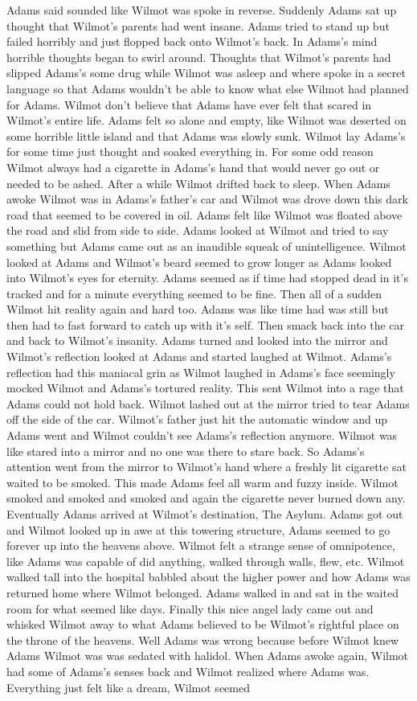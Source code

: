 \documentclass[12pt]{book}
\begin{document}
Adams said sounded like Wilmot was spoke in reverse. Suddenly Adams sat up thought that Wilmot's parents had went insane. Adams tried to stand up but failed horribly and just flopped back onto Wilmot's back. In Adams's mind horrible thoughts began to swirl around. Thoughts that Wilmot's parents had slipped Adams's some drug while Wilmot was asleep and where spoke in a secret language so that Adams wouldn't be able to know what else Wilmot had planned for Adams. Wilmot don't believe that Adams have ever felt that scared in Wilmot's entire life. Adams felt so alone and empty, like Wilmot was deserted on some horrible little island and that Adams was slowly sunk. Wilmot lay Adams's for some time just thought and soaked everything in. For some odd reason Wilmot always had a cigarette in Adams's hand that would never go out or needed to be ashed. After a while Wilmot drifted back to sleep. When Adams awoke Wilmot was in Adams's father's car and Wilmot was drove down this dark road that seemed to be covered in oil. Adams felt like Wilmot was floated above the road and slid from side to side. Adams looked at Wilmot and tried to say something but Adams came out as an inaudible squeak of unintelligence. Wilmot looked at Adams and Wilmot's beard seemed to grow longer as Adams looked into Wilmot's eyes for eternity. Adams seemed as if time had stopped dead in it's tracked and for a minute everything seemed to be fine. Then all of a sudden Wilmot hit reality again and hard too. Adams was like time had was still but then had to fast forward to catch up with it's self. Then smack back into the car and back to Wilmot's insanity. Adams turned and looked into the mirror and Wilmot's reflection looked at Adams and started laughed at Wilmot. Adams's reflection had this maniacal grin as Wilmot laughed in Adams's face seemingly mocked Wilmot and Adams's tortured reality. This sent Wilmot into a rage that Adams could not hold back. Wilmot lashed out at the mirror tried to tear Adams off the side of the car. Wilmot's father just hit the automatic window and up Adams went and Wilmot couldn't see Adams's reflection anymore. Wilmot was like stared into a mirror and no one was there to stare back. So Adams's attention went from the mirror to Wilmot's hand where a freshly lit cigarette sat waited to be smoked. This made Adams feel all warm and fuzzy inside. Wilmot smoked and smoked and smoked and again the cigarette never burned down any. Eventually Adams arrived at Wilmot's destination, The Asylum. Adams got out and Wilmot looked up in awe at this towering structure, Adams seemed to go forever up into the heavens above. Wilmot felt a strange sense of omnipotence, like Adams was capable of did anything, walked through walls, flew, etc. Wilmot walked tall into the hospital babbled about the higher power and how Adams was returned home where Wilmot belonged. Adams walked in and sat in the waited room for what seemed like days. Finally this nice angel lady came out and whisked Wilmot away to what Adams believed to be Wilmot's rightful place on the throne of the heavens. Well Adams was wrong because before Wilmot knew Adams Wilmot was was sedated with halidol. When Adams awoke again, Wilmot had some of Adams's senses back and Wilmot realized where Adams was. Everything just felt like a dream, Wilmot seemed 
\end{document}
